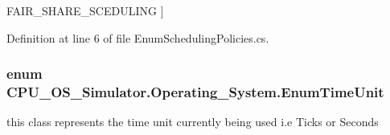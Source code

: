 \begin{Desc}
\begin{description}
{\hypertarget{namespace_c_p_u___o_s___simulator_1_1_operating___system_ad0cdaacf9652394d23fa29109640fe08abce82cf69e3b635b2e6aaacec9cb17dd}{}F\+A\+I\+R\+\_\+\+S\+H\+A\+R\+E\+\_\+\+S\+C\+E\+D\+U\+L\+I\+N\+G\label{namespace_c_p_u___o_s___simulator_1_1_operating___system_ad0cdaacf9652394d23fa29109640fe08abce82cf69e3b635b2e6aaacec9cb17dd}
}]\end{description}
\end{Desc}


Definition at line 6 of file Enum\+Scheduling\+Policies.\+cs.

\hypertarget{namespace_c_p_u___o_s___simulator_1_1_operating___system_a0553d0bc2513aec52caa769acf994d5c}{}
\subsubsection[{Enum\+Time\+Unit}]{\setlength{\rightskip}{0pt plus 5cm}enum {\bf C\+P\+U\+\_\+\+O\+S\+\_\+\+Simulator.\+Operating\+\_\+\+System.\+Enum\+Time\+Unit}\hspace{0.3cm}{\ttfamily [strong]}}\label{namespace_c_p_u___o_s___simulator_1_1_operating___system_a0553d0bc2513aec52caa769acf994d5c}


this class represents the time unit currently being used i.\+e Ticks or Seconds 

